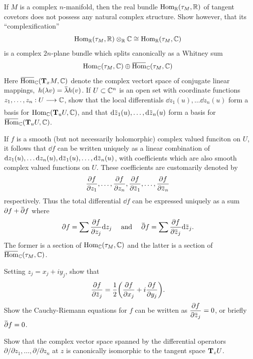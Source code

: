 \documentclass[../main]{subfiles}
\begin{document}
\begin{problem}\label{prob:13.F}
If $M$ is a complex $n$-manifold, then the real bundle $\Hom_\bR(\tangentbundle{M},\bR)$ of  tangent covetors does not possess any natural complex structure. Show however, that its ``complexification''
\[\Hom_\bR(\tangentbundle{M},\bR)\otimes_\bR \bC\cong \Hom_\bR(\tangentbundle{M},\bC)\]
is a complex $2n$-plane bundle which splits canonically as a Whitney sum
\[\Hom_\bC(\tangentbundle{M},\bC) \oplus \xoverline{\Hom}_\bC(\tangentbundle{M},\bC)\]
Here $\xoverline{\Hom}_\bC(\tangentspace{M}{x},\bC)$ denote the complex vectort space of conjugate linear mappings, $\,h(\lambda v)=\xoverline{\lambda} h(v)$. If $U\subset \bC^n$ is an open set with coordinate functions $z_1,\dots,z_n:U\varrightarrow{} \bC$, show that the local differentials $\dd z_1(u),\dots \dd z_n(u)$ form a basis for $\Hom_\bC(\tangentspace{U}{u},\bC)$, and that $\dd\xoverline{z}_1(u),\dots,\dd \xoverline{z}_n(u)$ form a basis for $\xoverline{\Hom}_\bC(\tangentspace{U}{u} , \bC)$.

If $f$ is a smooth (but not necessarily holomorphic) complex valued funciton on $U$, it follows that $\dd f$ can be written uniquely as a linear combination of $\dd z_1(u),\dots \dd z_n(u),\dd\xoverline{z}_1(u),\dots,\dd \xoverline{z}_n(u)$, with coefficients which are also smooth complex valued functions on $U$. These coefficients are customarily denoted by 
\[\dfrac{\partial f}{\partial z_1}, \dots, \dfrac{\partial f}{\partial z_n},\dfrac{\partial f}{\partial \xoverline{z}_1},\dots,\dfrac{ \partial f}{\partial \xoverline{z}_n}\]
respectively. Thus the total differential $\dd{f}$ can be expressed uniquely as a sum $\partial f +\xoverline{\partial}f$ where 
\[\partial f = \sum \dfrac{\partial f}{\partial z_j}\dd z_j \quad \text{ and }\quad \xoverline{\partial}f = \sum \dfrac{ \partial f}{\partial \xoverline{z}_j}\dd{\xoverline{z}_j}.\]
The former is a section of $\Hom_\bC(\tangentbundle{M},\bC)$ and the latter is a section of $\xoverline{\Hom}_\bC(\tangentbundle{M},\bC)$. 

Setting $z_j = x_j+iy_j$, show that \[\dfrac{\partial f}{\partial \xoverline{z}_j}=\dfrac{1}{2}\bigg(\dfrac{\partial f}{\partial x_j}+i\dfrac{\partial f}{\partial y_j}\bigg).\] Show the Cauchy-Riemann equations for $f$ can be written as $\dfrac{\partial f}{\partial \xoverline{z}_j}=0$, or briefly $\xoverline{\partial}f=0$.
\end{problem}

\begin{problem}
\label{prob:13.G} Show that the complex vector space spanned by the differential operators $\partial/\partial z_1,\dots, \partial/\partial z_n$ at $z$ is canonically isomorphic to the tangent space $\tangentspace{U}{z}$.
\end{problem}
\end{document}
